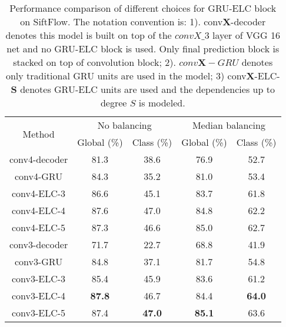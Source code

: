 \documentclass[10pt,twocolumn,letterpaper]{article}
\begin{document}
\begin{table*}
\begin{center}
\label{table:acs}
\begin{tabular}{c|c|c|c|c}
\hline
\multirow{2}{*}{Method} & \multicolumn{2}{c|}{No balancing}  & \multicolumn{2}{c}{ Median balancing} \\

 &   Global (\%) & Class (\%) & Global (\%) & Class (\%) \\



\hline \hline
conv4-decoder & 81.3 & 38.6 & 76.9 & 52.7 \\ %

conv4-GRU & 84.3 & 35.2 & 81.0  & 53.4 \\ %

\hline
\rowcolor{Gray}
conv4-ELC-3 & 86.6 & 45.1 & 83.7 & 61.8 \\ %

\rowcolor{Gray}
conv4-ELC-4 & 87.6 & 47.0 & 84.8 & 62.2 \\ %

\rowcolor{Gray}
conv4-ELC-5 & 87.3 & 46.6 & 85.0 & 62.7 \\

\hline \hline
conv3-decoder & 71.7  & 22.7 & 68.8 & 41.9 \\ %

conv3-GRU & 84.8 & 37.1 & 81.7  &  54.8 \\  %

\hline

\rowcolor{Gray}
conv3-ELC-3 & 85.4 & 45.9 & 83.6  &  61.2 \\ %

\rowcolor{Gray}
conv3-ELC-4 & \textbf{87.8} & 46.7 & 84.4 & \textbf{64.0} \\ %

\rowcolor{Gray}
conv3-ELC-5 & 87.4 & \textbf{47.0} & \textbf{85.1}  & 63.6 \\  %
\hline

\end{tabular}
\end{center}
\caption{Performance comparison of different choices for GRU-ELC block on SiftFlow. The notation convention is: 1). conv\textbf{X}-decoder denotes this model is built on top of the $convX\_3$ layer of VGG 16 net and no GRU-ELC block is used. Only final prediction block is stacked on top of convolution block; 2). $conv\textbf{X}-GRU$ denotes only traditional GRU units are used in the model; 3) conv\textbf{X}-ELC-\textbf{S} denotes GRU-ELC units are used and the dependencies up to degree $S$ is modeled.}
\label{all_siftflow}
\end{table*}
\end{document}

